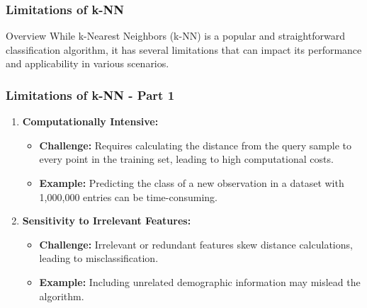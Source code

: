 \documentclass[aspectratio=169]{beamer}
\begin{document}
\begin{frame}[fragile]
    \frametitle{Limitations of k-NN}
    \begin{block}{Overview}
        While k-Nearest Neighbors (k-NN) is a popular and straightforward classification algorithm, it has several limitations that can impact its performance and applicability in various scenarios.
    \end{block}
\end{frame}

\begin{frame}[fragile]
    \frametitle{Limitations of k-NN - Part 1}
    \begin{enumerate}
        \item \textbf{Computationally Intensive:}
            \begin{itemize}
                \item \textbf{Challenge:} Requires calculating the distance from the query sample to every point in the training set, leading to high computational costs.
                \item \textbf{Example:} Predicting the class of a new observation in a dataset with 1,000,000 entries can be time-consuming.
            \end{itemize}
        
        \item \textbf{Sensitivity to Irrelevant Features:}
            \begin{itemize}
                \item \textbf{Challenge:} Irrelevant or redundant features skew distance calculations, leading to misclassification.
                \item \textbf{Example:} Including unrelated demographic information may mislead the algorithm.
            \end{itemize}
    \end{enumerate}
\end{frame}
\end{document}

